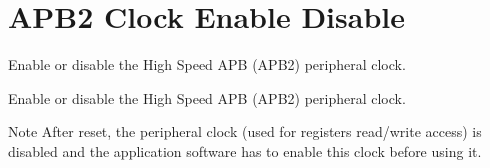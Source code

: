 \hypertarget{group___r_c_c_ex___a_p_b2___clock___enable___disable}{}\section{A\+P\+B2 Clock Enable Disable}
\label{group___r_c_c_ex___a_p_b2___clock___enable___disable}


Enable or disable the High Speed A\+PB (A\+P\+B2) peripheral clock.  


Enable or disable the High Speed A\+PB (A\+P\+B2) peripheral clock. 

\begin{DoxyNote}{Note}
After reset, the peripheral clock (used for registers read/write access) is disabled and the application software has to enable this clock before using it. 
\end{DoxyNote}

